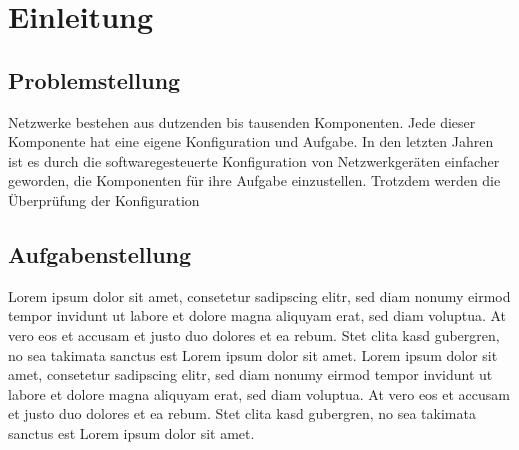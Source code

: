 \documentclass[]{subfiles}
\begin{document}
    \section{Einleitung}
    \subsection{Problemstellung}
    Netzwerke bestehen aus dutzenden bis tausenden Komponenten. 
    Jede dieser Komponente hat eine eigene Konfiguration und Aufgabe.
    In den letzten Jahren ist es durch die softwaregesteuerte Konfiguration
    von Netzwerkgeräten einfacher geworden, die Komponenten für ihre
    Aufgabe einzustellen. Trotzdem werden die Überprüfung der Konfiguration 

    \subsection{Aufgabenstellung}
    Lorem ipsum dolor sit amet, consetetur sadipscing elitr, sed diam nonumy eirmod tempor invidunt ut labore et dolore magna aliquyam erat, sed diam voluptua. At vero eos et accusam et justo duo dolores et ea rebum. Stet clita kasd gubergren, no sea takimata sanctus est Lorem ipsum dolor sit amet. Lorem ipsum dolor sit amet, consetetur sadipscing elitr, sed diam nonumy eirmod tempor invidunt ut labore et dolore magna aliquyam erat, sed diam voluptua. At vero eos et accusam et justo duo dolores et ea rebum. Stet clita kasd gubergren, no sea takimata sanctus est Lorem ipsum dolor sit amet.
\end{document}

